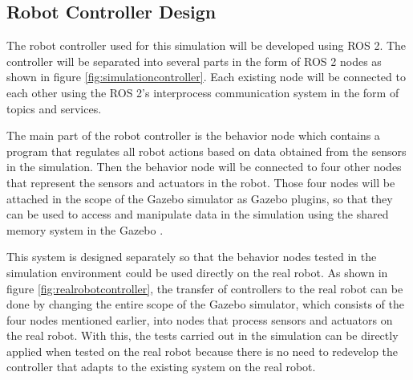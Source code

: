 \subsection{Robot Controller Design}
\label{subsec:controllerdesign}



The robot controller used for this simulation will be developed using ROS 2.
The controller will be separated into several parts in the form of ROS 2 nodes as shown in figure \ref{fig:simulationcontroller}.
Each existing node will be connected to each other using the ROS 2's interprocess communication system in the form of topics and services.

The main part of the robot controller is the behavior node which contains a program that regulates all robot actions based on data obtained from the sensors in the simulation.
Then the behavior node will be connected to four other nodes that represent the sensors and actuators in the robot.
Those four nodes will be attached in the scope of the Gazebo simulator as Gazebo plugins,
  so that they can be used to access and manipulate data in the simulation using the shared memory system in the Gazebo \citep{gazeboplugins}.



This system is designed separately so that the behavior nodes tested in the simulation environment could be used directly on the real robot.
As shown in figure \ref{fig:realrobotcontroller},
  the transfer of controllers to the real robot can be done by changing the entire scope of the Gazebo simulator,
  which consists of the four nodes mentioned earlier,
  into nodes that process sensors and actuators on the real robot.
With this, the tests carried out in the simulation can be directly applied when tested on the real robot because there is no need to redevelop the controller that adapts to the existing system on the real robot.
